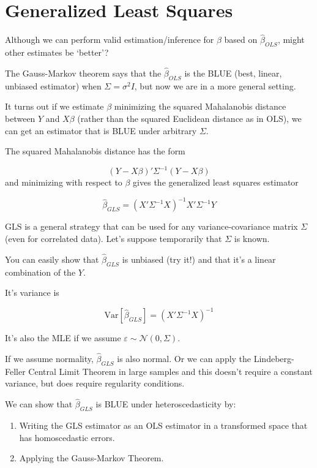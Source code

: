 \documentclass[
  letterpaper,
  DIV=11,
  numbers=noendperiod]{scrreport}
\providecommand{\tightlist}{%
  \setlength{\itemsep}{0pt}\setlength{\parskip}{0pt}}\usepackage{longtable,booktabs,array}
\begin{document}
\hypertarget{generalized-least-squares}{%
\section{Generalized Least Squares}\label{generalized-least-squares}}

Although we can perform valid estimation/inference for \(\beta\) based
on \(\hat \beta_{OLS}\), might other estimates be `better'?

The Gauss-Markov theorem says that the \(\hat \beta_{OLS}\) is the BLUE
(best, linear, unbiased estimator) when \(\Sigma = \sigma^2 I\), but now
we are in a more general setting.

It turns out if we estimate \(\beta\) minimizing the squared Mahalanobis
distance between \(Y\) and \(X\beta\) (rather than the squared Euclidean
distance as in OLS), we can get an estimator that is BLUE under
arbitrary \(\Sigma\).

The squared Mahalanobis distance has the form

\[(Y - X\beta)' \Sigma^{-1} (Y - X \beta)
\] and minimizing with respect to \(\beta\) gives the generalized least
squares estimator

\[\hat \beta_{GLS} = (X'\Sigma^{-1}X)^{-1} X' \Sigma^{-1} Y
\]

GLS is a general strategy that can be used for any variance-covariance
matrix \(\Sigma\) (even for correlated data). Let's suppose temporarily
that \(\Sigma\) is known.

You can easily show that \(\hat \beta_{GLS}\) is unbiased (try it!) and
that it's a linear combination of the \(Y\).

It's variance is

\[\text{Var}[\hat \beta_{GLS}] = (X'\Sigma^{-1}X)^{-1}
\]

It's also the MLE if we assume
\(\varepsilon \sim \mathcal N(0, \Sigma)\).

If we assume normality, \(\hat \beta_{GLS}\) is also normal. Or we can
apply the Lindeberg-Feller Central Limit Theorem in large samples and
this doesn't require a constant variance, but does require regularity
conditions.

We can show that \(\hat \beta_{GLS}\) is BLUE under heteroscedasticity
by:

\begin{enumerate}
\def\labelenumi{\arabic{enumi}.}
\tightlist
\item
  Writing the GLS estimator as an OLS estimator in a transformed space
  that has homoscedastic errors.
\item
  Applying the Gauss-Markov Theorem.
\end{enumerate}
\end{document}
